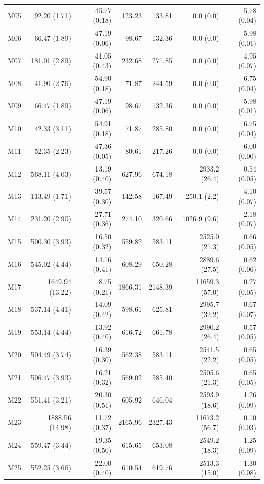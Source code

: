 \documentclass[11pt]{article}
\theoremstyle{remark}
\begin{document}
\begin{longtable}{lrrrrrr}
M05 & 92.20 (1.71) & 45.77 (0.18) & 123.23 & 133.81 & 0.0 (0.0) & 5.78 (0.04) \\
M06 & 66.47 (1.89) & 47.19 (0.06) & 98.67 & 132.36 & 0.0 (0.0) & 5.98 (0.01) \\
M07 & 181.01 (2.89) & 41.05 (0.43) & 232.68 & 271.85 & 0.0 (0.0) & 4.95 (0.07) \\
M08 & 41.90 (2.76) & 54.90 (0.18) & 71.87 & 244.59 & 0.0 (0.0) & 6.75 (0.04) \\
M09 & 66.47 (1.89) & 47.19 (0.06) & 98.67 & 132.36 & 0.0 (0.0) & 5.98 (0.01) \\
M10 & 42.33 (3.11) & 54.91 (0.18) & 71.87 & 285.80 & 0.0 (0.0) & 6.75 (0.04) \\
M11 & 52.35 (2.23) & 47.36 (0.05) & 80.61 & 217.26 & 0.0 (0.0) & 6.00 (0.00) \\
M12 & 568.11 (4.03) & 13.19 (0.40) & 627.96 & 674.18 & 2933.2 (26.4) & 0.54 (0.05) \\
M13 & 113.49 (1.71) & 39.57 (0.30) & 142.58 & 167.49 & 250.1 (2.2) & 4.10 (0.07) \\
M14 & 231.20 (2.90) & 27.71 (0.36) & 274.10 & 320.66 & 1026.9 (9.6) & 2.18 (0.07) \\
M15 & 500.30 (3.93) & 16.50 (0.32) & 559.82 & 583.11 & 2525.0 (21.3) & 0.66 (0.05) \\
M16 & 545.02 (4.44) & 14.16 (0.41) & 608.29 & 650.28 & 2889.6 (27.5) & 0.62 (0.06) \\
M17 & 1649.94 (13.22) & 8.75 (0.21) & 1866.31 & 2148.39 & 11659.3 (57.0) & 0.27 (0.05) \\
M18 & 537.14 (4.41) & 14.09 (0.42) & 598.61 & 625.81 & 2995.7 (32.2) & 0.67 (0.07) \\
M19 & 553.14 (4.44) & 13.92 (0.40) & 616.72 & 661.78 & 2990.2 (26.4) & 0.57 (0.05) \\
M20 & 504.49 (3.74) & 16.39 (0.30) & 562.38 & 583.11 & 2541.5 (22.2) & 0.65 (0.05) \\
M21 & 506.47 (3.93) & 16.21 (0.32) & 569.02 & 585.40 & 2505.6 (21.3) & 0.65 (0.05) \\
M22 & 551.41 (3.21) & 20.30 (0.51) & 605.92 & 646.04 & 2593.9 (18.6) & 1.26 (0.09) \\
M23 & 1888.56 (14.98) & 11.72 (0.37) & 2165.96 & 2327.43 & 11673.2 (56.7) & 0.10 (0.03) \\
M24 & 559.47 (3.44) & 19.35 (0.50) & 615.65 & 653.08 & 2549.2 (18.3) & 1.25 (0.09) \\
M25 & 552.25 (3.66) & 22.00 (0.40) & 610.54 & 619.76 & 2513.3 (15.0) & 1.30 (0.08) \\

\end{longtable}
\end{document}
